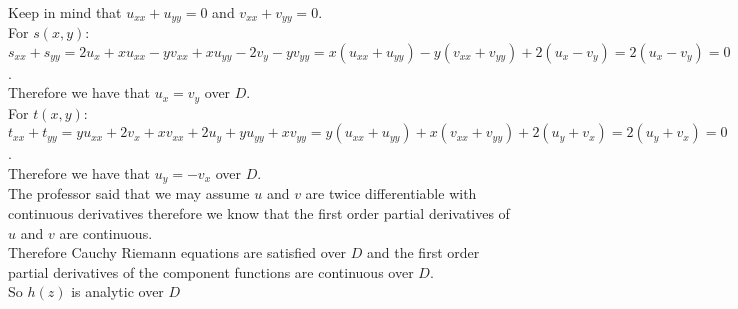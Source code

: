\documentclass{article}
\begin{document}
\begin{center}
    \\Keep in mind that $u_{xx} + u_{yy} = 0$ and $v_{xx} + v_{yy} = 0$.
    \\For $s(x, y)$:
    \\$s_{xx} + s_{yy} = 2u_x + xu_{xx} - yv_{xx} + xu_{yy} - 2v_y - yv_{yy} = x(u_{xx} + u_{yy}) - y(v_{xx} + v_{yy}) + 2(u_x - v_y) = 2(u_x - v_y) = 0$.
    \\Therefore we have that $u_x = v_y$ over $D$.
    \break
    \\For $t(x, y)$:
    \\$t_{xx} + t_{yy} = yu_{xx} + 2v_x + xv_{xx} + 2u_y + yu_{yy} + xv_{yy} = y(u_{xx} + u_{yy}) + x(v_{xx} + v_{yy}) + 2(u_y + v_x) = 2(u_y + v_x) = 0$.
    \\Therefore we have that $u_y = -v_x$ over $D$.
    \break
    \\The professor said that we may assume $u$ and $v$ are twice differentiable with continuous derivatives therefore we know that the first order partial derivatives of $u$ and $v$ are continuous.
    \\Therefore Cauchy Riemann equations are satisfied over $D$ and the first order partial derivatives of the component functions are continuous over $D$.
    \\So $h(z)$ is analytic over $D$ \qedsymbol
\end{center}


\newpage
\end{document}
